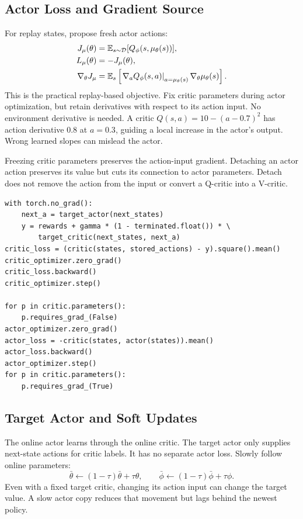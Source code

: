 \subsection{Actor Loss and Gradient Source}
For replay states, propose fresh actor actions:
\begin{align}
J_\mu(\theta)&=\mathbb{E}_{s\sim\mathcal{D}}[Q_\phi(s,\mu_\theta(s))],\\
L_\mu(\theta)&=-J_\mu(\theta),\\
\nabla_\theta J_\mu
&=\mathbb{E}_s\left[
\left.\nabla_a Q_\phi(s,a)\right|_{a=\mu_\theta(s)}
\nabla_\theta\mu_\theta(s)\right].
\end{align}
This is the practical replay-based objective.
Fix critic parameters during actor optimization, but retain derivatives
with respect to its action input. No environment derivative is needed.
A critic $Q(s,a)=10-(a-0.7)^2$ has action derivative $0.8$ at $a=0.3$,
guiding a local increase in the actor's output. Wrong learned slopes
can mislead the actor.

\begin{pitfall}
Freezing critic parameters preserves the action-input gradient.
Detaching an actor action preserves its value but cuts its connection
to actor parameters. Detach does not remove the action from the input
or convert a Q-critic into a V-critic.
\end{pitfall}

\begin{verbatim}
with torch.no_grad():
    next_a = target_actor(next_states)
    y = rewards + gamma * (1 - terminated.float()) * \
        target_critic(next_states, next_a)
critic_loss = (critic(states, stored_actions) - y).square().mean()
critic_optimizer.zero_grad()
critic_loss.backward()
critic_optimizer.step()

for p in critic.parameters():
    p.requires_grad_(False)
actor_optimizer.zero_grad()
actor_loss = -critic(states, actor(states)).mean()
actor_loss.backward()
actor_optimizer.step()
for p in critic.parameters():
    p.requires_grad_(True)
\end{verbatim}

\subsection{Target Actor and Soft Updates}
The online actor learns through the online critic.
The target actor only supplies next-state actions for critic labels.
It has no separate actor loss. Slowly follow online parameters:
\begin{equation}
\bar\theta\leftarrow(1-\tau)\bar\theta+\tau\theta,\qquad
\bar\phi\leftarrow(1-\tau)\bar\phi+\tau\phi.
\end{equation}
Even with a fixed target critic, changing its action input can change
the target value. A slow actor copy reduces that movement but lags
behind the newest policy.

